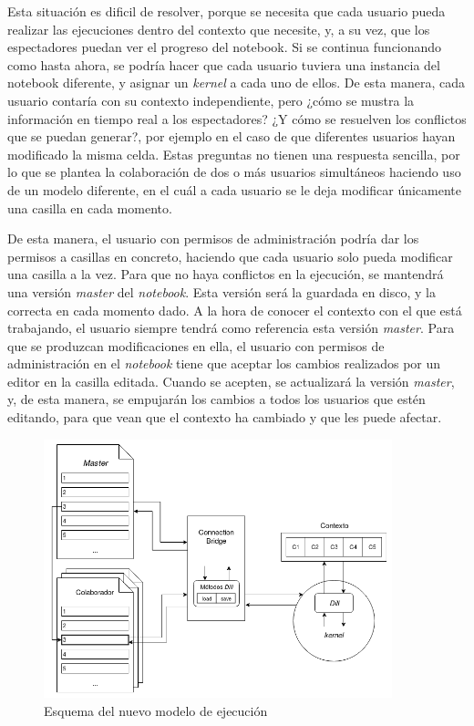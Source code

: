 \documentclass[11pt,spanish,listoffigures,listoftables]{tfgetsinf}
\begin{document}
Esta situación es dificil de resolver, porque se necesita que cada usuario pueda realizar las ejecuciones dentro del contexto que necesite, y, a su vez, que los espectadores puedan ver el progreso del notebook. Si se continua funcionando como hasta ahora, se podría hacer que cada usuario tuviera una instancia del notebook diferente, y asignar un \textit{kernel} a cada uno de ellos. De esta manera, cada usuario contaría con su contexto independiente, pero ¿cómo se mustra la información en tiempo real a los espectadores? ¿Y cómo se resuelven los conflictos que se puedan generar?, por ejemplo en el caso de que diferentes usuarios hayan modificado la misma celda. Estas preguntas no tienen una respuesta sencilla, por lo que se plantea la colaboración de dos o más usuarios simultáneos haciendo uso de un modelo diferente, en el cuál a cada usuario se le deja modificar únicamente una casilla en cada momento.

De esta manera, el usuario con permisos de administración podría dar los permisos a casillas en concreto, haciendo que cada usuario solo pueda modificar una casilla a la vez. Para que no haya conflictos en la ejecución, se mantendrá una versión \textit{master} del \textit{notebook}. Esta versión será la guardada en disco, y la correcta en cada momento dado. A la hora de conocer el contexto con el que está trabajando, el usuario siempre tendrá como referencia esta versión \textit{master}. Para que se produzcan modificaciones en ella, el usuario con permisos de administración en el \textit{notebook} tiene que aceptar los cambios realizados por un editor en la casilla editada. Cuando se acepten, se actualizará la versión \textit{master}, y, de esta manera, se empujarán los cambios a todos los usuarios que estén editando, para que vean que el contexto ha cambiado y que les puede afectar.

\begin{figure}[H]
	\centering
  	\includegraphics[width=0.9\textwidth]{mejora_ejecucion.png}
  	\caption{Esquema del nuevo modelo de ejecución}
  	\label{fig:new-exec}
\end{figure}
\end{document}
